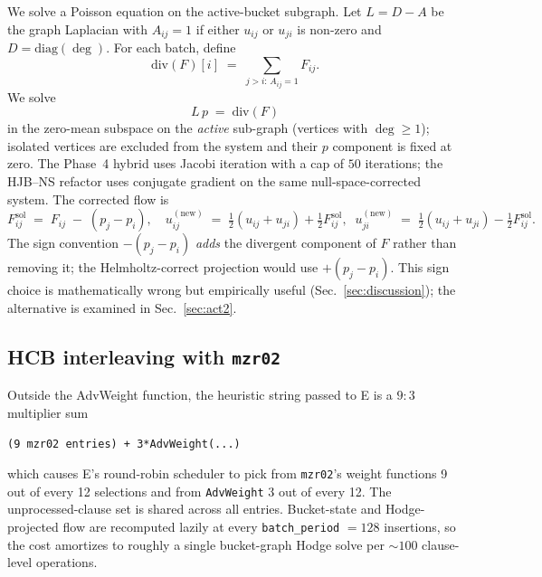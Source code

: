 \documentclass[11pt]{article}
\newcommand{\lid}[1]{{\ttfamily\nolinkurl{#1}}}
\begin{document}
We solve a Poisson equation on the active-bucket subgraph. Let
$L = D - A$ be the graph Laplacian with $A_{ij} = 1$ if either
$u_{ij}$ or $u_{ji}$ is non-zero and $D = \mathrm{diag}(\deg)$.
For each batch, define
\begin{equation}
   \mathrm{div}(F)[i] \;=\; \sum_{j > i:\, A_{ij} = 1} F_{ij}.
\end{equation}
We solve
\begin{equation}
   L\,p \;=\; \mathrm{div}(F)
\end{equation}
in the zero-mean subspace on the \emph{active} sub-graph (vertices with
$\deg \geq 1$); isolated vertices are excluded from the system and their
$p$ component is fixed at zero. The Phase~4 hybrid uses Jacobi iteration with
a cap of $50$ iterations; the HJB--NS refactor uses conjugate gradient on the
same null-space-corrected system. The corrected flow is
\begin{equation}
   F^{\mathrm{sol}}_{ij} \;=\; F_{ij} \;-\; (p_j - p_i),
   \quad
   u^{\mathrm{(new)}}_{ij}
   \;=\;
   \tfrac12 (u_{ij} + u_{ji}) + \tfrac12 F^{\mathrm{sol}}_{ij},
   \;\;
   u^{\mathrm{(new)}}_{ji}
   \;=\;
   \tfrac12 (u_{ij} + u_{ji}) - \tfrac12 F^{\mathrm{sol}}_{ij}.
\end{equation}
The sign convention $-\!(p_j - p_i)$ \emph{adds} the divergent component of
$F$ rather than removing it; the Helmholtz-correct projection would use
$+\!(p_j - p_i)$. This sign choice is mathematically wrong but empirically
useful (Sec.~\ref{sec:discussion}); the alternative is examined in
Sec.~\ref{sec:act2}.

\subsection{HCB interleaving with \texttt{mzr02}}

Outside the AdvWeight function, the heuristic string passed to E is a
$9{:}3$ multiplier sum
\begin{center}
\lid{(9 mzr02 entries) + 3*AdvWeight(...)}
\end{center}
which causes E's round-robin scheduler to pick from \texttt{mzr02}'s
weight functions 9 out of every 12 selections and from \lid{AdvWeight} 3
out of every 12. The unprocessed-clause set is shared across all entries.
Bucket-state and Hodge-projected flow are recomputed lazily at every
\lid{batch_period} $= 128$ insertions, so the cost amortizes to roughly a
single bucket-graph Hodge solve per $\sim 100$ clause-level operations.
\end{document}
